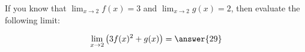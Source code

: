 \documentclass{ximera}
\author{Steven Gubkin}
\begin{document}
\begin{exercise}

	If you know that $\lim_{x \to 2} f(x) = 3$ and $\lim_{x \to 2} g(x) = 2$, then evaluate the following limit:
	
	\[
		\lim_{x \to 2} \left( 3 f(x)^2 + g(x) \right) = \answer{29}
	\]
	
\end{exercise}
\end{document}

